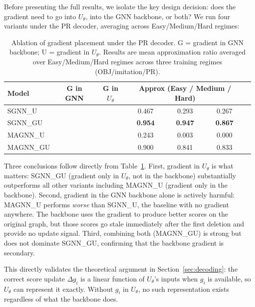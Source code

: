 \documentclass[11pt]{article}
\newcommand{\change}[1]{{\color{red}#1}}
\newcommand{\cmark}{\ding{51}}
\newcommand{\xmark}{\ding{55}}
\theoremstyle{plain}
\theoremstyle{definition}
\theoremstyle{remark}
\begin{document}
\change{Before presenting the full results, we isolate the key design decision: does
  the gradient need to go into $U_\theta$, into the GNN backbone, or both? We run four
  variants under the PR decoder, averaging across Easy/Medium/Hard regimes:

  \begin{table}[t]
    \centering
    \caption{\change{Ablation of gradient placement under the PR decoder. G = gradient
        in GNN backbone; U = gradient in $U_\theta$. Results are mean approximation ratio
        averaged over Easy/Medium/Hard regimes across three training regimes
    (OBJ/imitation/PR).}}
    \label{tab:ablation}
    \begin{tabular}{lcccccc}
      \toprule
      Model & G in GNN & G in $U_\theta$
      & \multicolumn{3}{c}{Approx (Easy / Medium / Hard)} \\
      \midrule
      SGNN\_U  & \xmark & \xmark & 0.467 & 0.293 & 0.267 \\
      SGNN\_GU & \xmark & \cmark & \textbf{0.954} & \textbf{0.947} & \textbf{0.867} \\
      MAGNN\_U & \cmark & \xmark & 0.243 & 0.003 & 0.000 \\
      MAGNN\_GU& \cmark & \cmark & 0.900 & 0.841 & 0.833 \\
      \bottomrule
    \end{tabular}
  \end{table}

  Three conclusions follow directly from Table~\ref{tab:ablation}. First, gradient in
  $U_\theta$ is what matters: SGNN\_GU (gradient only in $U_\theta$, not in the
  backbone) substantially outperforms all other variants including MAGNN\_U (gradient
  only in the backbone). Second, gradient in the GNN backbone alone is actively harmful:
  MAGNN\_U performs \emph{worse} than SGNN\_U, the baseline with no gradient anywhere.
  The backbone uses the gradient to produce better scores on the original graph, but
  those scores go stale immediately after the first deletion and provide no update
  signal. Third, combining both (MAGNN\_GU) is strong but does not dominate SGNN\_GU,
  confirming that the backbone gradient is secondary.

  This directly validates the theoretical argument in Section~\ref{sec:decoding}: the
  correct score update $\Delta g_i$ is a linear function of $U_\theta$'s inputs when
  $g_i$ is available, so $U_\theta$ can represent it exactly. Without $g_i$ in
$U_\theta$, no such representation exists regardless of what the backbone does.}
\label{sec:main_results}
\end{document}
